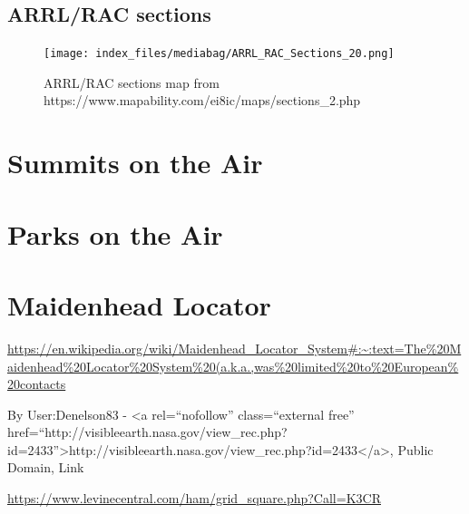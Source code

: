 \documentclass[
  letterpaper,
  DIV=11,
  numbers=noendperiod]{scrreport}
\begin{document}
\hypertarget{arrlrac-sections}{%
\subsection*{ARRL/RAC sections}\label{arrlrac-sections}}

\begin{figure}

{\centering \texttt{[image: index\_files/mediabag/ARRL\_RAC\_Sections\_20.png]}

}

\caption{ARRL/RAC sections map from
https://www.mapability.com/ei8ic/maps/sections\_2.php}

\end{figure}

\hypertarget{summits-on-the-air}{%
\section*{Summits on the Air}\label{summits-on-the-air}}


\hypertarget{parks-on-the-air}{%
\section*{Parks on the Air}\label{parks-on-the-air}}


\hypertarget{maidenhead-locator}{%
\section*{Maidenhead Locator}\label{maidenhead-locator}}


\url{https://en.wikipedia.org/wiki/Maidenhead_Locator_System\#:~:text=The\%20Maidenhead\%20Locator\%20System\%20(a.k.a.,was\%20limited\%20to\%20European\%20contacts}

By User:Denelson83 - \textless a rel=``nofollow'' class=``external
free''
href=``http://visibleearth.nasa.gov/view\_rec.php?id=2433''\textgreater http://visibleearth.nasa.gov/view\_rec.php?id=2433\textless/a\textgreater,
Public Domain, Link

\url{https://www.levinecentral.com/ham/grid_square.php?Call=K3CR}
\end{document}
